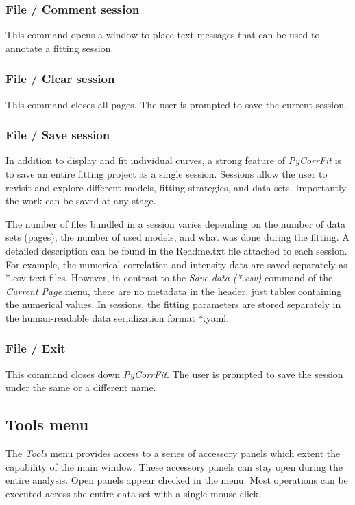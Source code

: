 \subsubsection{File / Comment session}
\label{sec:menub.filem.comme}
This command opens a window to place text messages that can be used to annotate a fitting session.

\subsubsection{File / Clear session}
\label{sec:menub.filem.clear}
This command closes all pages. The user is prompted to save the current session.

\subsubsection{File / Save session}
\label{sec:menub.filem.saves}
In addition to display and fit individual curves, a strong feature of \textit{PyCorrFit} is to save an entire fitting project as a single session. Sessions allow the user to revisit and explore different models, fitting strategies, and data sets. Importantly the work can be saved at any stage.

The number of files bundled in a session varies depending on the number of data sets (pages), the number of used models, and what was done during the fitting. A detailed description can be found in the Readme.txt file attached to each session. For example, the numerical correlation and intensity data are saved separately as *.csv text files. However, in contrast to the \textit{Save data (*.csv)} command of the \textit{Current Page} menu, there are no metadata in the header, just tables containing the numerical values. In sessions, the fitting parameters are stored separately in the human-readable data serialization format *.yaml.

\subsubsection{File / Exit}
\label{sec:menub.filem.exit}
This command closes down \textit{PyCorrFit}. The user is prompted to save the session under the same or a different name.

\subsection{Tools menu}
\label{sec:menub.tools}
The \textit{Tools} menu provides access to a series of accessory panels which extent the capability of the main window. These accessory panels can stay open during the entire analysis. Open panels appear checked in the menu. Most operations can be executed across the entire data set with a single mouse click. 


